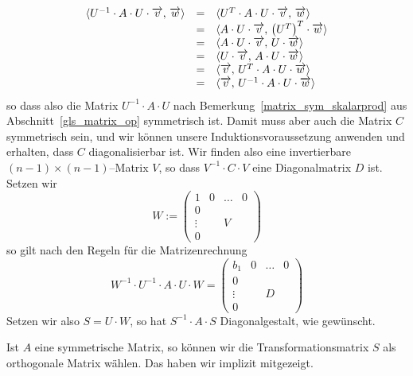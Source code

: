 {$$\begin{array} {l c l}
  	\langle  U^{-1} \cdot A \cdot U \cdot \overrightarrow{v}, \, \overrightarrow{w} \rangle 
   	& = &  \langle  U^{T} \cdot A \cdot U \cdot \overrightarrow{v}, \, \overrightarrow{w} \rangle \\
  	& = &  \langle   A \cdot U \cdot \overrightarrow{v}, \,\left( U^T\right)^T \cdot \overrightarrow{w} \rangle \\
  	& =& \langle   A \cdot U \cdot \overrightarrow{v}, \,U \cdot \overrightarrow{w} \rangle \\
  	& = & \langle  U  \cdot \overrightarrow{v}, \,  A \cdot U \cdot \overrightarrow{w} \rangle \\
  	& = & \langle \overrightarrow{v}, \, U^T \cdot A \cdot U \cdot \overrightarrow{w} \rangle \\
  	& = & \langle \overrightarrow{v}, \, U^{-1} \cdot A \cdot U \cdot \overrightarrow{w} \rangle
  	\end{array} $$
so dass also die Matrix $U^{-1} \cdot A \cdot U$ nach Bemerkung~\ref{matrix_sym_skalarprod} 
aus Abschnitt~\ref{gls_matrix_op} symmetrisch ist. Damit muss aber auch die Matrix $C$ symmetrisch sein, 
und wir können unsere Induktionsvoraussetzung anwenden und erhalten, dass $C$ diagonalisierbar ist. 
Wir finden also eine invertierbare $(n-1) \times (n-1)$--Matrix $V$, so dass $V^{-1} \cdot C \cdot V$ eine 
Diagonalmatrix $D$ ist. Setzen wir 
  	$$ W :=  \left( \begin{matrix} 1 & 0 & \hdots & 0 \\ 0 & & & \\ \vdots & & V & \\  0 & & &
	\end{matrix} \right) $$
so gilt nach den Regeln für die Matrizenrechnung
  	$$ W^{-1} \cdot U^{-1} \cdot A \cdot U \cdot W = \left( \begin{matrix} b_1 & 0 & \hdots & 0 \\ 0 & & & \\ 
	\vdots & & D & \\  0 & & &   \end{matrix} \right) $$
Setzen wir also $S = U \cdot W$, so hat $S^{-1} \cdot A \cdot S$ Diagonalgestalt, wie gewünscht. 
}

\bigbreak

\begin{notiz} Ist $A$ eine symmetrische Matrix, so können wir die Transformationsmatrix $S$ als orthogonale 
Matrix wählen. Das haben wir implizit mitgezeigt.
\end{notiz}

